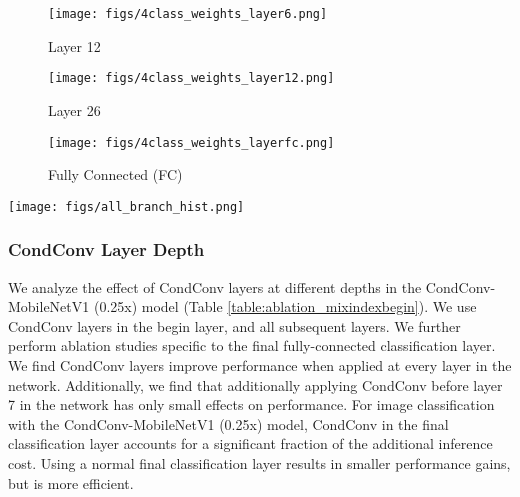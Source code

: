 \documentclass{article}
\def\codename{CondConv}
\begin{document}
\begin{figure*}[t]\centering
\begin{subfigure}[b]{0.3\textwidth}
\centering\texttt{[image: figs/4class\_weights\_layer6.png]}
\caption{\label{fig:layer7} Layer 12}
\end{subfigure}\begin{subfigure}[b]{0.3\textwidth}
\centering\texttt{[image: figs/4class\_weights\_layer12.png]}
\caption{\label{fig:layer13} Layer 26}
\end{subfigure}\begin{subfigure}[b]{0.3\textwidth}
\centering\texttt{[image: figs/4class\_weights\_layerfc.png]}
\caption{\label{fig:layer14} Fully Connected (FC)}
\end{subfigure}\caption{Mean routing weights for four classes averaged across the ImageNet validation set at three different depths in our \codename{}-MobileNetV1 (0.5x) model. \codename{} routing weights are more class-specific at greater depth.}
\label{fig:branch_weights_layer}

\bigskip

\centering
\texttt{[image: figs/all\_branch\_hist.png]}
\caption{Distribution of routing weights in the final \codename{} layer of our \codename{}-MobileNetV1 (0.5x) model when evaluated on all images in the ImageNet validation set. Routing weights follow a bi-modal distribution.}
\label{fig:branch_hist}
\end{figure*}

\subsubsection{\codename{} Layer Depth}

We analyze the effect of \codename{} layers at different depths in the \codename{}-MobileNetV1 (0.25x) model (Table \ref{table:ablation_mixindexbegin}). We use \codename{} layers in the begin layer, and all subsequent layers. We further perform ablation studies specific to the final fully-connected classification layer. We find \codename{} layers improve performance when applied at every layer in the network. Additionally, we find that additionally applying \codename{} before layer 7 in the network has only small effects on performance. For image classification with the \codename{}-MobileNetV1 (0.25x) model, \codename{} in the final classification layer accounts for a significant fraction of the additional inference cost. Using a normal final classification layer results in smaller performance gains, but is more efficient.
\end{document}
